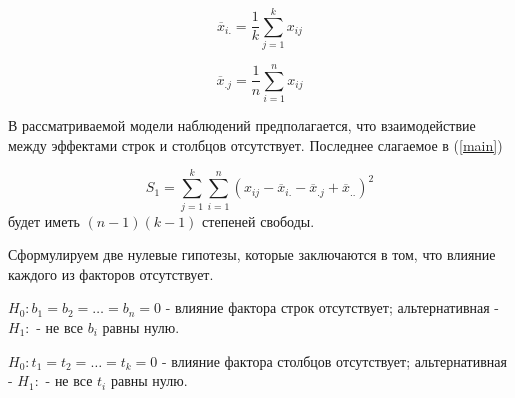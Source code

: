 \begin{equation*}
	\overline{x}_{i.} = \frac{1}{k} \sum\limits_{j=1}^k x_{ij}
\end{equation*}

\begin{equation*}
	\overline{x}_{.j} = \frac{1}{n} \sum\limits_{i=1}^n x_{ij}
\end{equation*}

В рассматриваемой модели наблюдений предполагается, что взаимодействие между эффектами строк и столбцов отсутствует. Последнее слагаемое в (\ref{main}) 

\begin{equation}
	S_1 = \sum\limits_{j=1}^k \sum\limits_{i=1}^n \left(x_{ij} - \overline{x}_{i.} - \overline{x}_{.j} + \overline{x}_{..} \right)^2
\end{equation}
будет иметь $(n - 1)(k - 1)$ степеней свободы.

Сформулируем две нулевые гипотезы, которые заключаются в том, что влияние каждого из факторов отсутствует.

$H_0: b_1 = b_2 = \ldots = b_n = 0$ - влияние фактора строк отсутствует; альтернативная - $H_1:$ - не все $b_i$ равны нулю.

$H_0: t_1 = t_2 = \ldots = t_k = 0$ - влияние фактора столбцов отсутствует; альтернативная - $H_1:$ - не все $t_i$ равны нулю.

